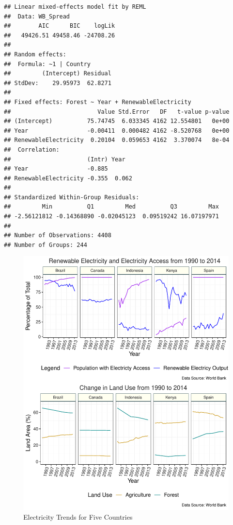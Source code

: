 \documentclass[12pt,]{article}
\begin{document}
\begin{verbatim}
## Linear mixed-effects model fit by REML
##  Data: WB_Spread 
##        AIC      BIC    logLik
##   49426.51 49458.46 -24708.26
## 
## Random effects:
##  Formula: ~1 | Country
##         (Intercept) Residual
## StdDev:    29.95973  62.8271
## 
## Fixed effects: Forest ~ Year + RenewableElectricity 
##                         Value Std.Error   DF   t-value p-value
## (Intercept)          75.74745  6.033345 4162 12.554801   0e+00
## Year                 -0.00411  0.000482 4162 -8.520768   0e+00
## RenewableElectricity  0.20104  0.059653 4162  3.370074   8e-04
##  Correlation: 
##                      (Intr) Year  
## Year                 -0.885       
## RenewableElectricity -0.355  0.062
## 
## Standardized Within-Group Residuals:
##         Min          Q1         Med          Q3         Max 
## -2.56121812 -0.14368890 -0.02045123  0.09519242 16.07197971 
## 
## Number of Observations: 4408
## Number of Groups: 244
\end{verbatim}

\begin{figure}
\centering
\includegraphics{Marx_ENV872_Project_files/figure-latex/unnamed-chunk-11-1.pdf}
\caption{\label{fig:fig6}Electricity Trends for Five Countries}
\end{figure}
\end{document}
